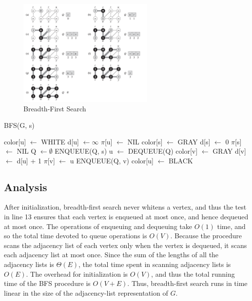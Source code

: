 \begin{figure}[H]
    \centering
    \includegraphics[width=0.6\textwidth]{assets/bfs.png}
    \caption{Breadth-First Search}
    \label{fig:bfs}
\end{figure}

\begin{algorithm}[H]
    \caption{BFS(G, s)}
    \begin{algorithmic}[1]
         
            \State color[u] $\gets$ WHITE
            \State d[u] $\gets \infty$
            \State $\pi$[u] $\gets$ NIL
        \EndFor
        \State 
        \State color[s] $\gets$ GRAY 
        \State d[s] $\gets$ 0
        \State $\pi$[s] $\gets$ NIL
        \State Q $\gets \emptyset$
        \State ENQUEUE(Q, s)
        \State 
         
            \State u $\gets$ DEQUEUE(Q)
                    \State color[v] $\gets$ GRAY
                    \State d[v] $\gets$ d[u] + 1
                    \State $\pi$[v] $\gets$ u
                    \State ENQUEUE(Q, v)
                \EndIf
            \EndFor
            \State color[u] $\gets$ BLACK
        \EndWhile
    \end{algorithmic}
\end{algorithm}

\subsection*{Analysis}

After initialization, breadth-first search never whitens a vertex, and thus the test in line 13 ensures that each vertex is enqueued at most once, and hence dequeued at most once. The operations of enqueuing and dequeuing take $O(1)$ time, and so the total time devoted to queue operations is $O(V)$. Because the procedure scans the adjacency list of each vertex only when the vertex is dequeued, it scans each adjacency list at most once. Since the sum of the lengths of all the adjacency lists is $\Theta(E)$, the total time spent in scanning adjacency lists is $O(E)$. The overhead for initialization is $O(V)$, and thus the total running time of the BFS procedure is $O(V + E)$. Thus, breadth-first search runs in time linear in the size of the adjacency-list representation of $G$.

